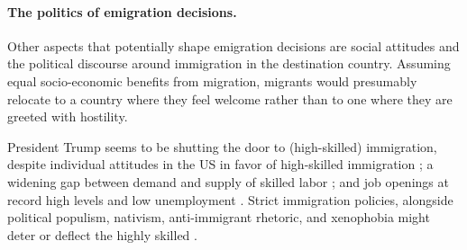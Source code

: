 \documentclass[12pt]{article}
\begin{document}
\paragraph{The politics of emigration decisions.} 
Other aspects that potentially shape emigration decisions are social attitudes and the political discourse around immigration in the destination country. Assuming equal socio-economic benefits from migration, migrants would presumably relocate to a country where they feel welcome rather than to one where they are greeted with hostility. 

\par President Trump seems to be shutting the door to (high-skilled) immigration, despite individual attitudes in the US in favor of high-skilled immigration \citep{Iyengar2013, Valentino2017}; a widening gap between demand and supply of skilled labor \citep{Chaloff2009}; and job openings at record high levels and low unemployment \citep{Desilver2017}. Strict immigration policies, alongside political populism, nativism, anti-immigrant rhetoric, and xenophobia might deter or deflect the highly skilled \citep{Czaika2017b}. %

\end{document}
